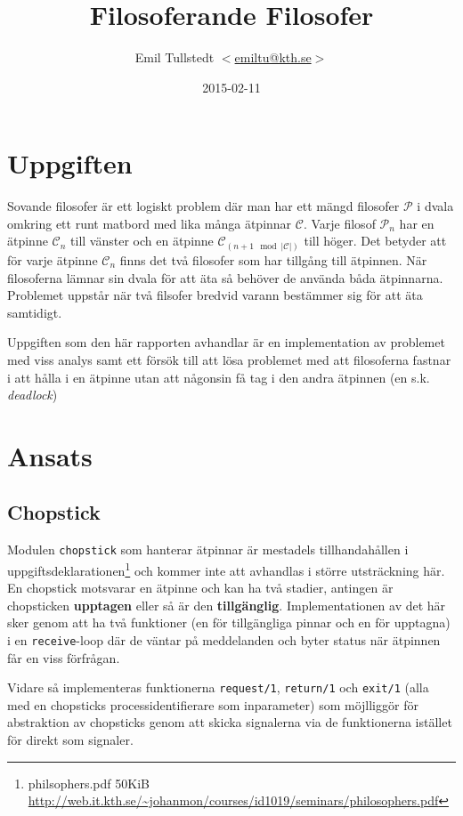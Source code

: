 \documentclass[a4paper, 11pt]{article}
\title{Filosoferande Filosofer}
\author{Emil Tullstedt \href{mailto:emiltu@kth.se}{$<$emiltu@kth.se$>$}}
\date{2015-02-11}
\begin{document}
\maketitle

\section{Uppgiften}
\label{sec:uppgiften}

Sovande filosofer är ett logiskt problem där man har ett mängd filosofer $\mathcal{P}$ i dvala omkring ett runt matbord med lika många ätpinnar $\mathcal{C}$. Varje filosof $\mathcal{P}_n$ har en ätpinne $\mathcal{C}_n$ till vänster och en ätpinne $\mathcal{C}_{(n+1\mod |\mathcal{C}|)}$ till höger. Det betyder att för varje ätpinne $\mathcal{C}_n$ finns det två filosofer som har tillgång till ätpinnen. När filosoferna lämnar sin dvala för att äta så behöver de använda båda ätpinnarna. Problemet uppstår när två filsofer bredvid varann bestämmer sig för att äta samtidigt.

Uppgiften som den här rapporten avhandlar är en implementation av problemet med viss analys samt ett försök till att lösa problemet med att filosoferna fastnar i att hålla i en ätpinne utan att någonsin få tag i den andra ätpinnen (en s.k. \textit{deadlock})

\section{Ansats}

\subsection{Chopstick}
\label{subsec:chopstick}
Modulen \texttt{chopstick} som hanterar ätpinnar är mestadels tillhandahållen i uppgiftsdeklarationen\footnote{philsophers.pdf 50KiB \url{http://web.it.kth.se/~johanmon/courses/id1019/seminars/philosophers.pdf}} och kommer inte att avhandlas i större utsträckning här. En chopstick motsvarar en ätpinne och kan ha två stadier, antingen är chopsticken \textbf{upptagen} eller så är den \textbf{tillgänglig}. Implementationen av det här sker genom att ha två funktioner (en för tillgängliga pinnar och en för upptagna) i en \texttt{receive}-loop där de väntar på meddelanden och byter status när ätpinnen får en viss förfrågan.

Vidare så implementeras funktionerna \texttt{request/1}, \texttt{return/1} och \texttt{exit/1} (alla med en chopsticks processidentifierare som inparameter) som möjlliggör för abstraktion av chopsticks genom att skicka signalerna via de funktionerna istället för direkt som signaler.
\end{document}

